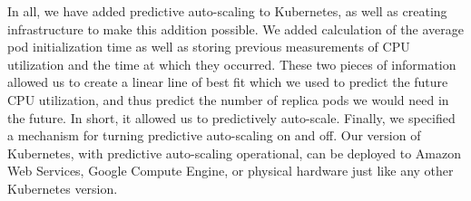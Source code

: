 In all, we have added predictive auto-scaling to Kubernetes, as well as
creating infrastructure to make this addition possible. We added calculation of
the average pod initialization time as well as storing previous measurements of
CPU utilization and the time at which they occurred. These two pieces of
information allowed us to create a linear line of best fit which we used to
predict the future CPU utilization, and thus predict the number of replica pods
we would need in the future. In short, it allowed us to predictively auto-scale.
Finally, we specified a mechanism for turning predictive auto-scaling on and
off. Our version of Kubernetes, with predictive auto-scaling operational, can be
deployed to Amazon Web Services, Google Compute Engine, or physical hardware
just like any other Kubernetes version.
